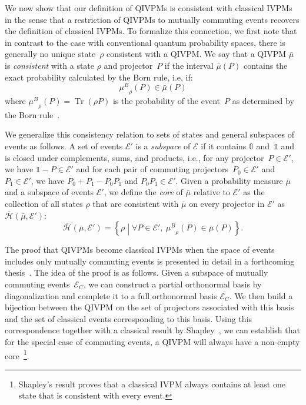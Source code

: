 \documentclass[english,reprint, aps, prl,superscriptaddress, showpacs,
showkeys, longbibliography, amsmath, amssymb, floatfix]{revtex4-1}
\theoremstyle{plain}
\theoremstyle{definition}
\newcommand{\Hilb}{\mathcal{H}}
\newcommand{\events}{\ensuremath{\mathcal{E}}}
\newcommand{\set}[2]{\ensuremath{\left\{ {#1}\mathrel{}\middle|\mathrel{}{#2}\right\} }}
\newcommand{\Tr}{\ensuremath{\mathop{\mathrm{Tr}}\nolimits}}
\newcommand{\coreBorn}{\ensuremath{\overline{\Hilb}}}
\newcommand{\muB}{\ensuremath{\mu^{B}}}
\newcommand{\eventsC}{\ensuremath{\events_{C}}}
\begin{document}
We now show that our definition of QIVPMs is consistent with classical
IVPMs in the sense that a restriction of QIVPMs to mutually commuting
events recovers the definition of classical IVPMs. To formalize this
connection, we first note that in contrast to the case with
conventional quantum probability spaces, there is generally no unique
state~$\rho$ consistent with a QIVPM. We say that a QIVPM $\bar{\mu}$
is \emph{consistent} with a state $\rho$ and projector~$P$ if the
interval $\bar{\mu}(P)$ contains the exact probability calculated by
the Born rule, i.e, if:
\begin{equation}
\muB_{\rho}\left(P\right)\in\bar{\mu}\left(P\right)
\end{equation}
where $\muB_{\rho}\left(P\right)=\Tr\left(\rho P\right)$
is the probability of the event~$P$ as determined by the Born
rule~\citep{Born1983bibTeX,Mermin2007,Jaeger2007}.

We generalize this consistency relation to sets of states and general
subspaces of events as follows. A set of events $\events'$ is a
\emph{subspace} of $\events$ if it contains $\mathbb{0}$
and~$\mathbb{1}$ and is closed under complements, sums, and products,
i.e., for any projector~$P\in\events'$, we have
$\mathbb{1}-P\in\events'$ and for each pair of commuting
projectors~$P_{0}\in\events'$ and $P_{1}\in\events'$, we have
$P_{0}+P_{1}-P_{0}P_{1}$ and $P_{0}P_{1}\in\events'$. Given a
probability measure $\bar{\mu}$ and a subspace of events $\events'$,
we define the \emph{core} of $\bar{\mu}$ relative to $\events'$ as the
collection of all states $\rho$ that are consistent with $\bar{\mu}$
on every projector in $\events'$ as $\coreBorn(\bar{\mu},\events')$:
\begin{equation}
\label{eq:hbar}
\coreBorn\left(\bar{\mu},\events'\right)=\set{\rho}{\forall P\in \events',~\muB_{\rho}\left(P\right)\in\bar{\mu}\left(P\right)}.
\end{equation}

The proof that QIVPMs become classical IVPMs when the space of events
includes only mutually commuting events is presented in detail in a
forthcoming thesis~\cite{TaiThesis2018}. The idea of the proof is as
follows. Given a subspace of mutually commuting events~$\eventsC$, we
can construct a partial orthonormal basis by diagonalization and
complete it to a full orthonormal basis $\overline{\eventsC}$. We then
build a bijection between the QIVPM on the set of projectors
associated with this basis and the set of classical events
corresponding to this basis. Using this correspondence together with a
classical result by
Shapley~\cite{Shapley1971,GilboaSchmeidler1994,NgMoYeh1997,Grabisch2016},
we can establish that for the special case of commuting events, a
QIVPM will always have a non-empty core~\footnote{Shapley's result
  proves that a classical IVPM always contains at least one state that
  is consistent with every event.}.
\end{document}
